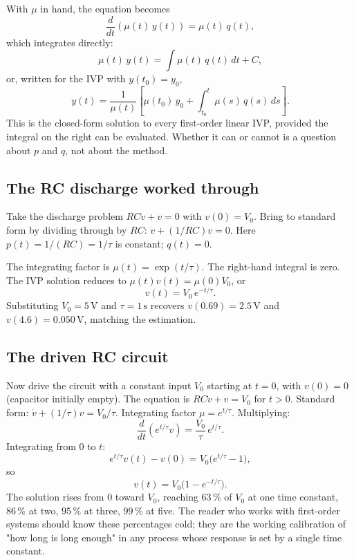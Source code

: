 With $\mu$ in hand, the equation becomes
\[
\frac{d}{dt}(\mu(t)\, y(t)) = \mu(t)\, q(t),
\]
which integrates directly:
\[
\mu(t)\, y(t) = \int \mu(t)\, q(t)\,dt + C,
\]
or, written for the IVP with $y(t_{0}) = y_{0}$,
\[
y(t) = \frac{1}{\mu(t)}\!\left[\mu(t_{0})\, y_{0} + \int_{t_{0}}^{t} \mu(s)\, q(s)\,ds\right].
\]
This is the closed-form solution to every first-order linear IVP,
provided the integral on the right can be evaluated. Whether it can
or cannot is a question about $p$ and $q$, not about the method.

\subsection{The RC discharge worked through}

Take the discharge problem $RC \dot{v} + v = 0$ with $v(0) =
V_{0}$. Bring to standard form by dividing through by $RC$:
$\dot{v} + (1/RC) v = 0$. Here $p(t) = 1/(RC) = 1/\tau$ is
constant; $q(t) = 0$.

The integrating factor is $\mu(t) = \exp(t/\tau)$. The right-hand
integral is zero. The IVP solution reduces to $\mu(t) v(t) =
\mu(0) V_{0}$, or
\[
v(t) = V_{0}\, e^{-t/\tau}.
\]
Substituting $V_{0} = 5\,\si{\volt}$ and $\tau = 1\,\si{\second}$
recovers $v(0.69) = 2.5\,\si{\volt}$ and $v(4.6) =
0.050\,\si{\volt}$, matching the estimation.

\subsection{The driven RC circuit}

Now drive the circuit with a constant input $V_{0}$ starting at
$t = 0$, with $v(0) = 0$ (capacitor initially empty). The equation
is $RC \dot{v} + v = V_{0}$ for $t > 0$. Standard form:
$\dot{v} + (1/\tau) v = V_{0}/\tau$. Integrating factor $\mu =
e^{t/\tau}$. Multiplying:
\[
\frac{d}{dt}(e^{t/\tau} v) = \frac{V_{0}}{\tau}\, e^{t/\tau}.
\]
Integrating from $0$ to $t$:
\[
e^{t/\tau} v(t) - v(0) = V_{0}\bigl(e^{t/\tau} - 1\bigr),
\]
so
\[
v(t) = V_{0}\bigl(1 - e^{-t/\tau}\bigr).
\]
The solution rises from $0$ toward $V_{0}$, reaching $63\,\%$ of
$V_{0}$ at one time constant, $86\,\%$ at two, $95\,\%$ at three,
$99\,\%$ at five. The reader who works with first-order systems
should know these percentages cold; they are the working calibration
of "how long is long enough" in any process whose response is set
by a single time constant.



